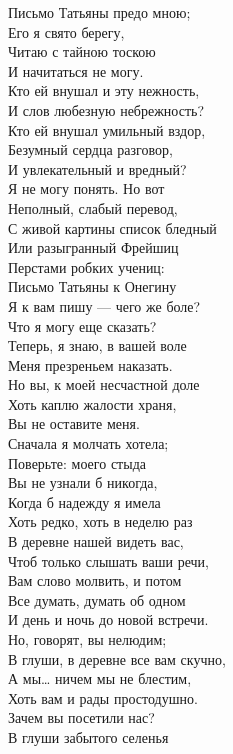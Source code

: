 {Письмо Татьяны предо мною;\\
Его я свято берегу,\\
Читаю с тайною тоскою\\
И начитаться не могу.\\
Кто ей внушал и эту нежность,\\
И слов любезную небрежность?\\
Кто ей внушал умильный вздор,\\
Безумный сердца разговор,\\
И увлекательный и вредный?\\
Я не могу понять. Но вот\\
Неполный, слабый перевод,\\
С живой картины список бледный\\
Или разыгранный Фрейшиц\\
Перстами робких учениц:\\
Письмо Татьяны к Онегину\\
Я к вам пишу — чего же боле?\\
Что я могу еще сказать?\\
Теперь, я знаю, в вашей воле\\
Меня презреньем наказать.\\
Но вы, к моей несчастной доле\\
Хоть каплю жалости храня,\\
Вы не оставите меня.\\
Сначала я молчать хотела;\\
Поверьте: моего стыда\\
Вы не узнали б никогда,\\
Когда б надежду я имела\\
Хоть редко, хоть в неделю раз\\
В деревне нашей видеть вас,\\
Чтоб только слышать ваши речи,\\
Вам слово молвить, и потом\\
Все думать, думать об одном\\
И день и ночь до новой встречи.\\
Но, говорят, вы нелюдим;\\
В глуши, в деревне все вам скучно,\\
А мы… ничем мы не блестим,\\
Хоть вам и рады простодушно.\\
Зачем вы посетили нас?\\
В глуши забытого селенья\\
}
